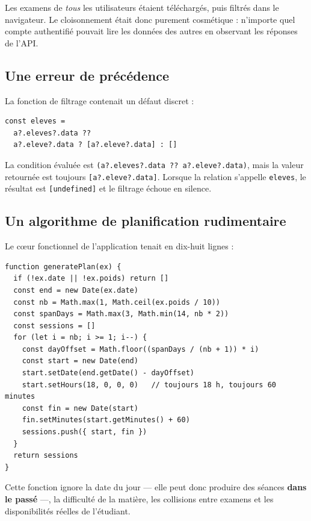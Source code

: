 \documentclass[11pt,a4paper]{report}
\begin{document}
Les examens de \emph{tous} les utilisateurs étaient téléchargés, puis filtrés dans
le navigateur. Le cloisonnement était donc purement cosmétique : n'importe quel
compte authentifié pouvait lire les données des autres en observant les réponses
de l'API.

\subsection{Une erreur de précédence}

La fonction de filtrage contenait un défaut discret :

\begin{lstlisting}[style=ts,caption={Précédence incorrecte entre \texttt{??} et l'opérateur ternaire}]
const eleves =
  a?.eleves?.data ??
  a?.eleve?.data ? [a?.eleve?.data] : []
\end{lstlisting}

La condition évaluée est \texttt{(a?.eleves?.data ?? a?.eleve?.data)}, mais la
valeur retournée est toujours \texttt{[a?.eleve?.data]}. Lorsque la relation
s'appelle \texttt{eleves}, le résultat est \texttt{[undefined]} et le filtrage
échoue en silence.

\subsection{Un algorithme de planification rudimentaire}

Le cœur fonctionnel de l'application tenait en dix-huit lignes :

\begin{lstlisting}[style=ts,caption={Génération du planning, version~1}]
function generatePlan(ex) {
  if (!ex.date || !ex.poids) return []
  const end = new Date(ex.date)
  const nb = Math.max(1, Math.ceil(ex.poids / 10))
  const spanDays = Math.max(3, Math.min(14, nb * 2))
  const sessions = []
  for (let i = nb; i >= 1; i--) {
    const dayOffset = Math.floor((spanDays / (nb + 1)) * i)
    const start = new Date(end)
    start.setDate(end.getDate() - dayOffset)
    start.setHours(18, 0, 0, 0)   // toujours 18 h, toujours 60 minutes
    const fin = new Date(start)
    fin.setMinutes(start.getMinutes() + 60)
    sessions.push({ start, fin })
  }
  return sessions
}
\end{lstlisting}

Cette fonction ignore la date du jour --- elle peut donc produire des séances
\textbf{dans le passé} ---, la difficulté de la matière, les collisions entre
examens et les disponibilités réelles de l'étudiant.
\end{document}
